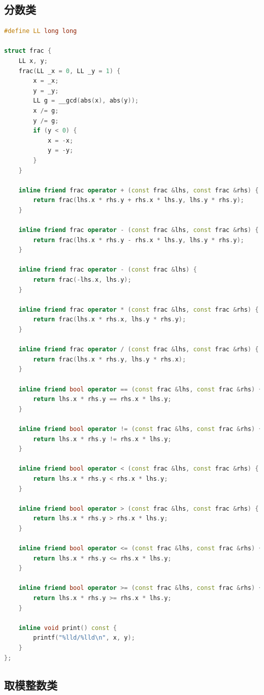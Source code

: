 \documentclass{article}
\begin{document}
\subsection{分数类}

\begin{lstlisting}[language=C++]
#define LL long long

struct frac {
	LL x, y;
	frac(LL _x = 0, LL _y = 1) {
		x = _x;
		y = _y;
		LL g = __gcd(abs(x), abs(y));
		x /= g;
		y /= g;
		if (y < 0) {
			x = -x;
			y = -y;
		}
	}

	inline friend frac operator + (const frac &lhs, const frac &rhs) {
		return frac(lhs.x * rhs.y + rhs.x * lhs.y, lhs.y * rhs.y);
	}

	inline friend frac operator - (const frac &lhs, const frac &rhs) {
		return frac(lhs.x * rhs.y - rhs.x * lhs.y, lhs.y * rhs.y);
	}

	inline friend frac operator - (const frac &lhs) {
		return frac(-lhs.x, lhs.y);
	}

	inline friend frac operator * (const frac &lhs, const frac &rhs) {
		return frac(lhs.x * rhs.x, lhs.y * rhs.y);
	}

	inline friend frac operator / (const frac &lhs, const frac &rhs) {
		return frac(lhs.x * rhs.y, lhs.y * rhs.x);
	}

	inline friend bool operator == (const frac &lhs, const frac &rhs) {
		return lhs.x * rhs.y == rhs.x * lhs.y;
	}

	inline friend bool operator != (const frac &lhs, const frac &rhs) {
		return lhs.x * rhs.y != rhs.x * lhs.y;
	}

	inline friend bool operator < (const frac &lhs, const frac &rhs) {
		return lhs.x * rhs.y < rhs.x * lhs.y;
	}

	inline friend bool operator > (const frac &lhs, const frac &rhs) {
		return lhs.x * rhs.y > rhs.x * lhs.y;
	}

	inline friend bool operator <= (const frac &lhs, const frac &rhs) {
		return lhs.x * rhs.y <= rhs.x * lhs.y;
	}

	inline friend bool operator >= (const frac &lhs, const frac &rhs) {
		return lhs.x * rhs.y >= rhs.x * lhs.y;
	}

	inline void print() const {
		printf("%lld/%lld\n", x, y);
	}
};
\end{lstlisting}

\subsection{取模整数类}
\end{document}

